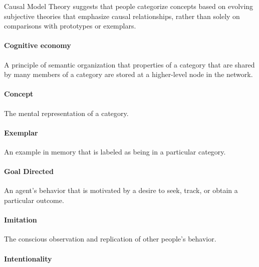 \documentclass[
]{krantz}
\begin{document}
Causal Model Theory suggests that people categorize concepts based on evolving subjective theories that emphasize causal relationships, rather than solely on comparisons with prototypes or exemplars.

\paragraph*{Cognitive economy}\label{cognitive-economy}

A principle of semantic organization that properties of a category that are shared by many members of a category are stored at a higher-level node in the network.

\paragraph*{Concept}\label{concept}

The mental representation of a category.

\paragraph*{Exemplar}\label{exemplar}

An example in memory that is labeled as being in a particular category.

\paragraph*{Goal Directed}\label{goal-directed}

An agent's behavior that is motivated by a desire to seek, track, or obtain a particular outcome.

\paragraph*{Imitation}\label{imitation}

The conscious observation and replication of other people's behavior.

\paragraph*{Intentionality}\label{intentionality}
\end{document}
